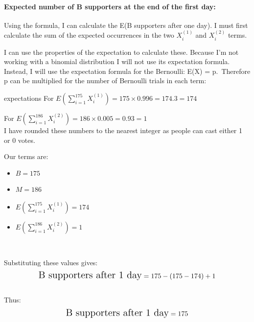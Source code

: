 \documentclass[
]{article}
\begin{document}
\paragraph{Expected number of B supporters at the end of the first
day:}\label{expected-number-of-b-supporters-at-the-end-of-the-first-day}

Using the formula, I can calculate the E(B supporters after one day). I
must first calculate the sum of the expected occurrences in the two
\(X_i^{(1)}\) and \(X_i^{(2)}\) terms.

I can use the properties of the expectation to calculate these. Because
I'm not working with a binomial distribution I will not use its
expectation formula. Instead, I will use the expectation formula for the
Bernoulli: E(X) = p.~Therefore p can be multiplied for the number of
Bernoulli trials in each term:

expectations For
\(E(\sum_{i=1}^{175} X_i^{(1)}) = 175 \times  0.996 = 174.3 = 174\)

For \(E(\sum_{i=1}^{186}X_i^{(2)}) = 186 \times 0.005 = 0.93 = 1\)\\

I have rounded these numbers to the nearest integer as people can cast
either 1 or 0 votes.

Our terms are:

\begin{itemize}
\item
  \(B = 175\)\\
\item
  \(M = 186\)\\
\item
  \(E(\sum_{i=1}^{175} X_i^{(1)}) = 174\)\\
\item
  \(E(\sum_{i=1}^{186}X_i^{(2)})  = 1\)\\
  \strut \\
\end{itemize}

Substituting these values gives:\\

\[
\Large
\text{B supporters after 1 day} = 175 -  (175-174) +  1 
\]\\

Thus:\\
\[
\Large
\text{B supporters after 1 day} = 175
\]\\
\strut \\
\strut \\
\strut \\
\strut \\
\end{document}
